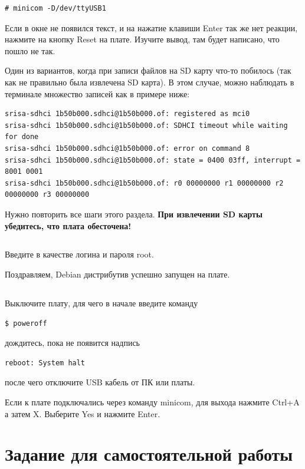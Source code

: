 \begin{lstlisting}[style=bash]
	# minicom -D/dev/ttyUSB1
\end{lstlisting}

Если в окне не появился текст, и на нажатие клавиши Enter так же нет реакции,  нажмите на кнопку Reset на плате. Изучите вывод, там будет написано, что пошло не так.

Один из вариантов, когда при записи файлов на SD карту что-то побилось (так как не правильно была извлечена SD карта). В этом случае, можно наблюдать в терминале множество записей как в примере ниже:
\begin{lstlisting}[style=stdout]
srisa-sdhci 1b50b000.sdhci@1b50b000.of: registered as mci0
srisa-sdhci 1b50b000.sdhci@1b50b000.of: SDHCI timeout while waiting for done
srisa-sdhci 1b50b000.sdhci@1b50b000.of: error on command 8
srisa-sdhci 1b50b000.sdhci@1b50b000.of: state = 0400 03ff, interrupt = 8001 0001
srisa-sdhci 1b50b000.sdhci@1b50b000.of: r0 00000000 r1 00000000 r2 00000000 r3 00000000
\end{lstlisting}

Нужно повторить все шаги этого раздела. \textbf{При извлечении SD карты убедитесь, что плата обесточена!}

\subsection{} Введите в качестве логина и пароля root.

Поздравляем, Debian дистрибутив успешно запущен на плате.

\subsection{} Выключите плату, для чего в начале введите команду
\begin{lstlisting}[style=bash]
$ poweroff
\end{lstlisting}
дождитесь, пока не появится надпись
\begin{lstlisting}[style=stdout]
reboot: System halt
\end{lstlisting}
после чего отключите USB кабель от ПК или платы. 

Если к плате подключались через команду minicom, для выхода нажмите Ctrl+A а затем X. Выберите Yes и нажмите Enter.
 
\section{Задание для самостоятельной работы}

